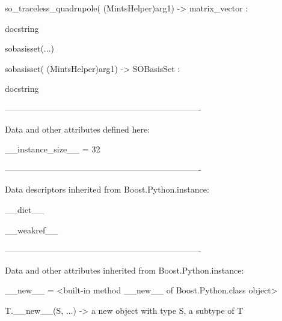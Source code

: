 \documentclass[letterpaper,10pt,english]{sphinxmanual}
\begin{document}
\begin{description}
\begin{description}
\begin{DUlineblock}{0em}
\begin{DUlineblock}{\DUlineblockindent}
\item[] so\_traceless\_quadrupole( (MintsHelper)arg1) -\textgreater{} matrix\_vector :
\item[]
\begin{DUlineblock}{\DUlineblockindent}
\item[] docstring
\item[] 
\end{DUlineblock}
\end{DUlineblock}
\item[] sobasisset(...)
\item[]
\begin{DUlineblock}{\DUlineblockindent}
\item[] sobasisset( (MintsHelper)arg1) -\textgreater{} SOBasisSet :
\item[]
\begin{DUlineblock}{\DUlineblockindent}
\item[] docstring
\item[] 
\end{DUlineblock}
\end{DUlineblock}
\item[] ----------------------------------------------------------------------
\item[] Data and other attributes defined here:
\item[] 
\item[] \_\_instance\_size\_\_ = 32
\item[] 
\item[] ----------------------------------------------------------------------
\item[] Data descriptors inherited from Boost.Python.instance:
\item[] 
\item[] \_\_dict\_\_
\item[] 
\item[] \_\_weakref\_\_
\item[] 
\item[] ----------------------------------------------------------------------
\item[] Data and other attributes inherited from Boost.Python.instance:
\item[] 
\item[] \_\_new\_\_ = \textless{}built-in method \_\_new\_\_ of Boost.Python.class object\textgreater{}
\item[]
\begin{DUlineblock}{\DUlineblockindent}
\item[] T.\_\_new\_\_(S, ...) -\textgreater{} a new object with type S, a subtype of T
\end{DUlineblock}
\end{DUlineblock}


\end{description}
\end{description}
\end{document}

